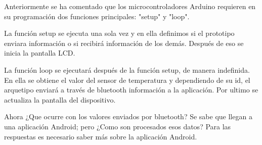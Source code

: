 \par \noindent
Anteriormente se ha comentado que los microcontroladores Arduino requieren en su programación dos funciones principales: "setup" y "loop". 

\par \noindent
La función setup se ejecuta una sola vez y en ella definimos si el prototipo enviara información o si recibirá información de los demás. Después de eso se inicia la pantalla LCD.

\par \noindent
La función loop se ejecutará después de la función setup, de manera indefinida. En ella se obtiene el valor del sensor de temperatura y dependiendo de su id, el arquetipo enviará a través de bluetooth información a la aplicación. Por ultimo se actualiza la pantalla del dispositivo.

\par \noindent
Ahora ¿Que ocurre con los valores enviados por bluetooth? Se sabe que llegan a una aplicación Android; pero ¿Como son procesados esos datos? Para las respuestas es necesario saber más sobre la aplicación Android.
